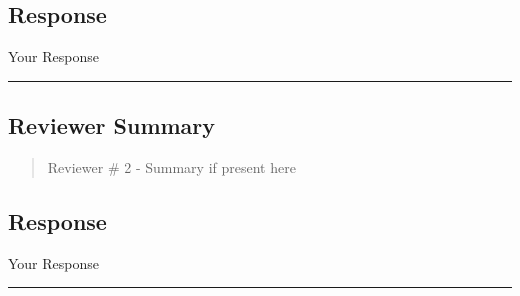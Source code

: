 \subsection{Response}  
Your Response \\
\noindent\rule{17cm}{2.0pt}


\subsection{Reviewer Summary}
\begin{mdframed}
\begin{quote}
	Reviewer \# 2 - Summary if present here
\end{quote}
\end{mdframed}

\subsection{Response} 
Your Response

\noindent\rule{17cm}{6.0pt}